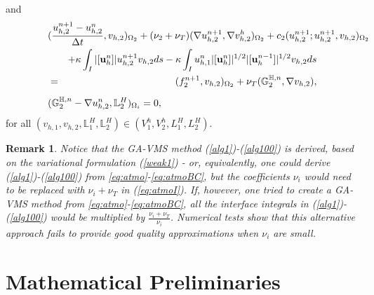 \documentclass[10pt]{article}%
\numberwithin{equation}{section}
\newtheorem{remark}{Remark}[section]
\newcommand{\bff}{{  f}}
\newcommand{\bu}{{\bf u}}
\begin{document}
and
\begin{eqnarray}
\lefteqn{(\frac{{u^{n+1}_{h,2}}-u_{h,2}^{n}}{\Delta t} ,v_{h,2})_{\Omega_2} +(\nu_2+\nu_T)(\nabla  {u}_{h,2}^{n+1},\nabla v_{h,2}^h)_{\Omega_2}
	+ c_2({u}_{h,2}^{n+1};{u}_{h,2}^{n+1},v_{h,2})_{\Omega_2}}
\nonumber\\
&&+\kappa \int_{I}|[\bu_h^n]|u_{h,2}^{n+1}v_{h,2}ds-\kappa \int_{I}u_{h,1}^n|[\bu_h^n]|^{1/2}|[\bu_h^{n-1}]|^{1/2}v_{h,2}ds\nonumber\\
&=&(\bff_2^{n+1},v_{h,2})_{\Omega_2}+\nu_T(\mathbb{G}_2^{\mathbb{H},n},\nabla v_{h,2}), \label{alg2} \\[5pt]
\lefteqn{(\mathbb{G}_2^{\mathbb{H},n}-\nabla u_{h,2}^n, \mathbb{L}_2^H)_{\Omega_i}=0, }\label{alg100}
\end{eqnarray}
for all $(v_{h,1},v_{h,2},\mathbb{L}_1^H,\mathbb{L}_2^H ) \in (V_1^h, V_2^h,L_1^H,L_2^H)$.


\begin{remark}\label{remark:alternative_approach}
Notice that the GA-VMS method (\ref{alg1})-(\ref{alg100}) is derived, based on the variational formulation (\ref{weak1}) - or, equivalently, one could derive (\ref{alg1})-(\ref{alg100}) from \eqref{eq:atmo}-\eqref{eq:atmoBC}, but the coefficients $\nu_i$ would need to be replaced with $\nu_i+\nu_T$ in (\ref{eq:atmoI}). If, however, one tried to create a GA-VMS method from \eqref{eq:atmo}-\eqref{eq:atmoBC}, all the interface integrals in (\ref{alg1})-(\ref{alg100}) would be multiplied by $\frac{\nu_i+\nu_T}{\nu_i}$. Numerical tests show that this alternative approach fails to provide good quality approximations when $\nu_i$ are small.
\end{remark}

\section{Mathematical Preliminaries}
\end{document}
